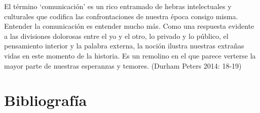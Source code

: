 \documentclass[
]{interact}
\begin{document}
El término `comunicación' es un rico entramado de hebras intelectuales y
culturales que codifica las confrontaciones de nuestra época consigo
misma. Entender la comunicación es entender mucho más. Como una
respuesta evidente a las divisiones dolorosas entre el yo y el otro, lo
privado y lo público, el pensamiento interior y la palabra externa, la
noción ilustra nuestras extrañas vidas en este momento de la historia.
Es un remolino en el que parece verterse la mayor parte de nuestras
esperanzas y temores. (Durham Peters 2014: 18-19)

\section*{Bibliografía}\label{bibliografuxeda}
\end{document}
